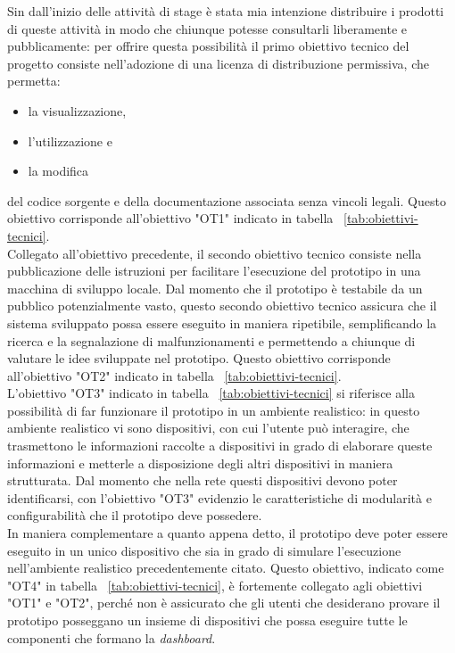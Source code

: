 Sin dall'inizio delle attività di stage è stata mia intenzione distribuire i prodotti di queste attività in modo che chiunque potesse consultarli liberamente e pubblicamente: per offrire questa possibilità il primo obiettivo tecnico del progetto consiste nell'adozione di una licenza di distribuzione permissiva, che permetta:
\begin{itemize}
  \item la visualizzazione,
  \item l'utilizzazione e
  \item la modifica
\end{itemize}
del codice sorgente e della documentazione associata senza vincoli legali. Questo obiettivo corrisponde all'obiettivo "OT1" indicato in tabella ~\ref{tab:obiettivi-tecnici}. \\
Collegato all'obiettivo precedente, il secondo obiettivo tecnico consiste nella pubblicazione delle istruzioni per facilitare l'esecuzione del prototipo in una macchina di sviluppo locale.
Dal momento che il prototipo è testabile da un pubblico potenzialmente vasto, questo secondo obiettivo tecnico assicura che il sistema sviluppato possa essere eseguito in maniera ripetibile, semplificando la ricerca e la segnalazione di malfunzionamenti e permettendo a chiunque di valutare le idee sviluppate nel prototipo. Questo obiettivo corrisponde all'obiettivo "OT2" indicato in tabella ~\ref{tab:obiettivi-tecnici}. \\
L'obiettivo "OT3" indicato in tabella ~\ref{tab:obiettivi-tecnici} si riferisce alla possibilità di far funzionare il prototipo in un ambiente realistico: in questo ambiente realistico vi sono dispositivi, con cui l'utente può interagire, che trasmettono le informazioni raccolte a dispositivi in grado di elaborare queste informazioni e metterle a disposizione degli altri dispositivi in maniera strutturata. Dal momento che nella rete questi dispositivi devono poter identificarsi, con l'obiettivo "OT3" evidenzio le caratteristiche di modularità e configurabilità che il prototipo deve possedere. \\
In maniera complementare a quanto appena detto, il prototipo deve poter essere eseguito in un unico dispositivo che sia in grado di simulare l'esecuzione nell'ambiente realistico precedentemente citato. Questo obiettivo, indicato come "OT4" in tabella ~\ref{tab:obiettivi-tecnici}, è fortemente collegato agli obiettivi "OT1" e "OT2", perché non è assicurato che gli utenti che desiderano provare il prototipo posseggano un insieme di dispositivi che possa eseguire tutte le componenti che formano la \emph{dashboard}. \\
